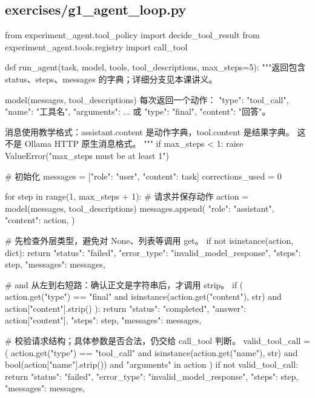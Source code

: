 \documentclass[UTF8,zihao=-4,fontset=fandol]{ctexart}
\begin{document}
\subsection{exercises/g1\_agent\_loop.py}

\begin{Code}
from experiment_agent.tool_policy import decide_tool_result
from experiment_agent.tools.registry import call_tool


def run_agent(task, model, tools, tool_descriptions, max_steps=5):
    """返回包含 status、steps、messages 的字典；详细分支见本课讲义。

    model(messages, tool_descriptions) 每次返回一个动作：
    {"type": "tool_call", "name": "工具名", "arguments": {...}}
    或 {"type": "final", "content": "回答"}。

    消息使用教学格式：assistant.content 是动作字典，tool.content 是结果字典。
    这不是 Ollama HTTP 原生消息格式。
    """
    if max_steps < 1:
        raise ValueError("max_steps must be at least 1")

    # 初始化
    messages = [{"role": "user", "content": task}]
    corrections_used = 0

    for step in range(1, max_steps + 1):
        # 请求并保存动作
        action = model(messages, tool_descriptions)
        messages.append({
            "role": "assistant",
            "content": action,
        })

        # 先检查外层类型，避免对 None、列表等调用 get。
        if not isinstance(action, dict):
            return {
                "status": "failed",
                "error_type": "invalid_model_response",
                "steps": step,
                "messages": messages,
            }

        # and 从左到右短路：确认正文是字符串后，才调用 strip。
        if (
            action.get("type") == "final"
            and isinstance(action.get("content"), str)
            and action["content"].strip()
        ):
            return {
                "status": "completed",
                "answer": action["content"],
                "steps": step,
                "messages": messages,
            }

        # 校验请求结构；具体参数是否合法，仍交给 call_tool 判断。
        valid_tool_call = (
            action.get("type") == "tool_call"
            and isinstance(action.get("name"), str)
            and bool(action["name"].strip())
            and "arguments" in action
        )
        if not valid_tool_call:
            return {
                "status": "failed",
                "error_type": "invalid_model_response",
                "steps": step,
                "messages": messages,
            }


\end{Code}
\end{document}
